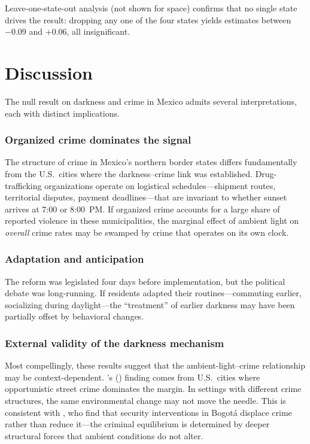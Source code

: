 \documentclass[12pt]{article}
\begin{document}
Leave-one-state-out analysis (not shown for space) confirms that no single state drives the result: dropping any one of the four states yields estimates between $-0.09$ and $+0.06$, all insignificant.

\section{Discussion}

The null result on darkness and crime in Mexico admits several interpretations, each with distinct implications.

\subsubsection*{Organized crime dominates the signal} The structure of crime in Mexico's northern border states differs fundamentally from the U.S.\ cities where the darkness--crime link was established. Drug-trafficking organizations operate on logistical schedules---shipment routes, territorial disputes, payment deadlines---that are invariant to whether sunset arrives at 7:00 or 8:00~PM. If organized crime accounts for a large share of reported violence in these municipalities, the marginal effect of ambient light on \textit{overall} crime rates may be swamped by crime that operates on its own clock.

\subsubsection*{Adaptation and anticipation} The reform was legislated four days before implementation, but the political debate was long-running. If residents adapted their routines---commuting earlier, socializing during daylight---the ``treatment'' of earlier darkness may have been partially offset by behavioral changes.

\subsubsection*{External validity of the darkness mechanism} Most compellingly, these results suggest that the ambient-light--crime relationship may be context-dependent. \citeauthor{doleac2015}'s (\citeyear{doleac2015}) finding comes from U.S.\ cities where opportunistic street crime dominates the margin. In settings with different crime structures, the same environmental change may not move the needle. This is consistent with \citet{blattman2017}, who find that security interventions in Bogot\'a displace crime rather than reduce it---the criminal equilibrium is determined by deeper structural forces that ambient conditions do not alter.
\end{document}
